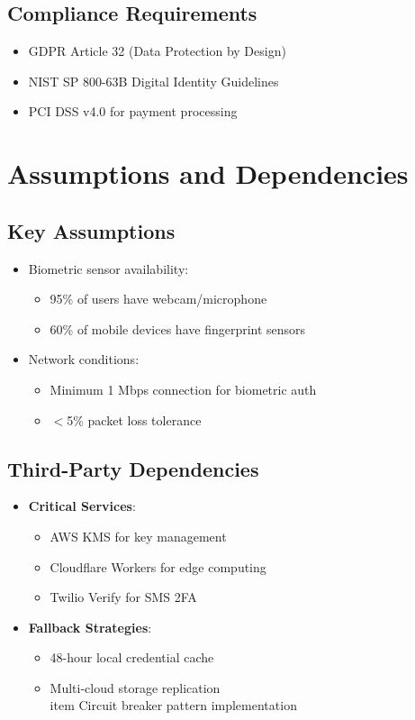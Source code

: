 \documentclass{scrreprt}
\begin{document}
\subsection{Compliance Requirements}
\begin{itemize}
    \item GDPR Article 32 (Data Protection by Design)
    \item NIST SP 800-63B Digital Identity Guidelines
    \item PCI DSS v4.0 for payment processing
\end{itemize}

\section{Assumptions and Dependencies}
\label{sec:assumptions}

\subsection{Key Assumptions}
\begin{itemize}
    \item Biometric sensor availability:
    \begin{itemize}
        \item 95\% of users have webcam/microphone
        \item 60\% of mobile devices have fingerprint sensors
    \end{itemize}
    
    \item Network conditions:
    \begin{itemize}
        \item Minimum 1 Mbps connection for biometric auth
        \item $<$5\% packet loss tolerance
    \end{itemize}
\end{itemize}

\subsection{Third-Party Dependencies}
\begin{itemize}
    \item \textbf{Critical Services}:
    \begin{itemize}
        \item AWS KMS for key management
        \item Cloudflare Workers for edge computing
        \item Twilio Verify for SMS 2FA
    \end{itemize}
    
    \item \textbf{Fallback Strategies}:
    \begin{itemize}
        \item 48-hour local credential cache
        \item Multi-cloud storage replication
        \\item Circuit breaker pattern implementation
    \end{itemize}
\end{itemize}
\end{document}
